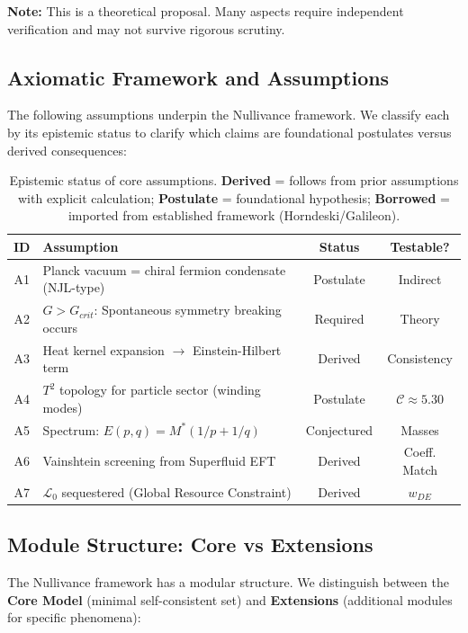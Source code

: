 \documentclass[a4paper,12pt]{article}
\begin{document}
\textbf{Note:} This is a theoretical proposal. Many aspects require independent verification and may not survive rigorous scrutiny.

\subsection{Axiomatic Framework and Assumptions}

The following assumptions underpin the Nullivance framework. We classify each by its epistemic status to clarify which claims are foundational postulates versus derived consequences:

\begin{table}[H]
\centering
\small
\begin{tabular}{clcc}
\toprule
\textbf{ID} & \textbf{Assumption} & \textbf{Status} & \textbf{Testable?} \\
\midrule
A1 & Planck vacuum = chiral fermion condensate (NJL-type) & Postulate & Indirect \\
A2 & $G > G_{crit}$: Spontaneous symmetry breaking occurs & Required & Theory \\
A3 & Heat kernel expansion $\to$ Einstein-Hilbert term & Derived & Consistency \\
A4 & $T^2$ topology for particle sector (winding modes) & Postulate & $\mathcal{C} \approx 5.30$ \\
A5 & Spectrum: $E(p,q) = M^*(1/p + 1/q)$ & Conjectured & Masses \\
A6 & Vainshtein screening from Superfluid EFT & Derived & Coeff. Match \\
A7 & $\mathcal{L}_0$ sequestered (Global Resource Constraint) & Derived & $w_{DE}$ \\
\bottomrule
\end{tabular}
\caption{Epistemic status of core assumptions. \textbf{Derived} = follows from prior assumptions with explicit calculation; \textbf{Postulate} = foundational hypothesis; \textbf{Borrowed} = imported from established framework (Horndeski/Galileon).}
\label{tab:assumptions}
\end{table}

\subsection{Module Structure: Core vs Extensions}

The Nullivance framework has a modular structure. We distinguish between the \textbf{Core Model} (minimal self-consistent set) and \textbf{Extensions} (additional modules for specific phenomena):
\end{document}
